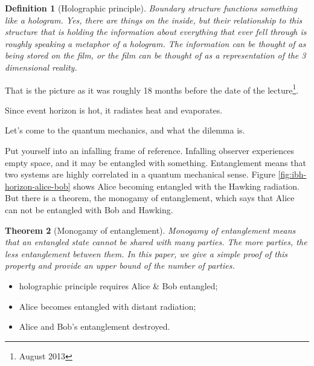 \documentclass[]{article}
\newtheorem{thm}{Theorem}
\newtheorem{defn}[thm]{Definition}
\begin{document}
\begin{defn}[Holographic principle]
	Boundary structure functions something like a hologram. Yes, there are things on the inside, but their relationship to this structure that is holding the information about everything that ever fell through is roughly speaking a metaphor of a hologram.  The information can be thought of as being stored on the film, or the film can be thought of as a representation of the 3 dimensional reality.
\end{defn}

That is the picture as it was roughly 18 months before the date of the lecture\footnote{August 2013}.

Since event horizon is hot, it radiates heat and evaporates.

Let's come to the quantum mechanics, and what the dilemma is.

Put yourself into an infalling frame of reference. 	Infalling observer experiences empty space, and it may be entangled with something. Entanglement means that two systems are highly correlated in a quantum mechanical sense. Figure \ref{fig:ibh-horizon-alice-bob} shows Alice becoming entangled with the Hawking radiation. But there is a theorem, the monogamy of entanglement, which says that Alice can not be entangled with Bob and Hawking. 

\begin{thm}[Monogamy of entanglement]
	Monogamy of entanglement means that an entangled state cannot be shared with many parties. The more parties, the less entanglement between them. In this paper, we give a simple proof of this property and provide an upper bound of the number of parties.\cite{Yang_2006} 
\end{thm}

\begin{itemize}
	\item holographic principle requires Alice \& Bob entangled;
	\item Alice becomes entangled with distant radiation;
	\item Alice and Bob's entanglement destroyed.
\end{itemize}
\end{document}
